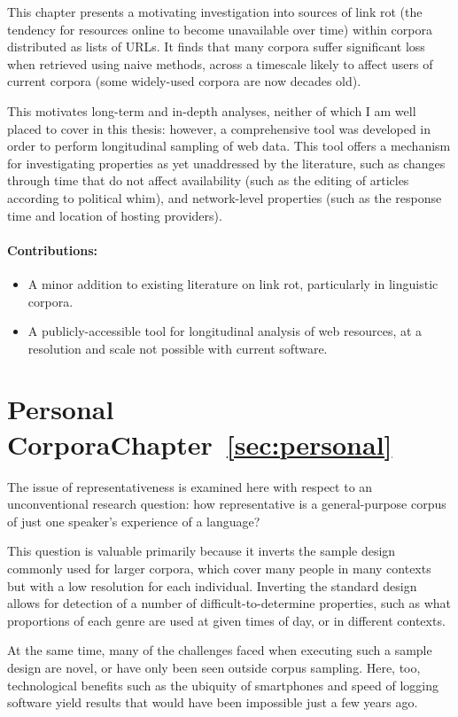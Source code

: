 This chapter presents a motivating investigation into sources of link rot (the tendency for resources online to become unavailable over time) within corpora distributed as lists of URLs.  It finds that many corpora suffer significant loss when retrieved using naive methods, across a timescale likely to affect users of current corpora (some widely-used corpora are now decades old).

This motivates long-term and in-depth analyses, neither of which I am well placed to cover in this thesis: however, a comprehensive tool was developed in order to perform longitudinal sampling of web data.  This tool offers a mechanism for investigating properties as yet unaddressed by the literature, such as changes through time that do not affect availability (such as the editing of articles according to political whim), and network-level properties (such as the response time and location of hosting providers).

\paragraph{Contributions:}
\begin{itemize}
    \item A minor addition to existing literature on link rot, particularly in linguistic corpora.
    \item A publicly-accessible tool for longitudinal analysis of web resources, at a resolution and scale not possible with current software.
\end{itemize}

\section*{Personal Corpora\hfill{}Chapter~\ref{sec:personal}}
The issue of representativeness is examined here with respect to an unconventional research question: how representative is a general-purpose corpus of just one speaker's experience of a language?

This question is valuable primarily because it inverts the sample design commonly used for larger corpora, which cover many people in many contexts but with a low resolution for each individual.
Inverting the standard design allows for detection of a number of difficult-to-determine properties, such as what proportions of each genre are used at given times of day, or in different contexts.

At the same time, many of the challenges faced when executing such a sample design are novel, or have only been seen outside corpus sampling.  Here, too, technological benefits such as the ubiquity of smartphones and speed of logging software yield results that would have been impossible just a few years ago.

